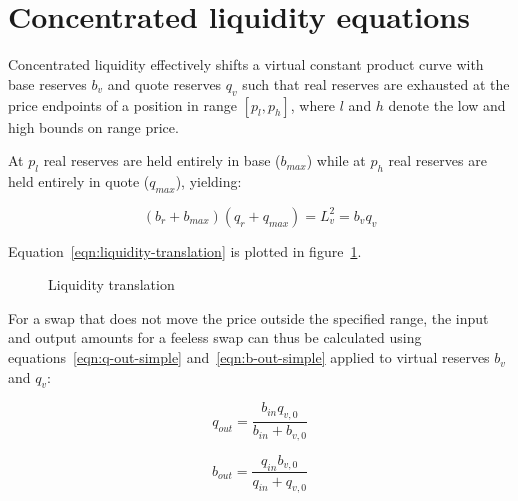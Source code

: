 \documentclass[twocolumn]{article}
\begin{document}
\section{Concentrated liquidity equations}


Concentrated liquidity effectively shifts a virtual constant product curve with base reserves $b_v$
and quote reserves $q_v$ such that real reserves are exhausted at the price endpoints of a position
in range $[p_l, p_h]$, where $l$ and $h$ denote the low and high bounds on range price.

At $p_l$ real reserves are held entirely in base ($b_{max}$) while at $p_h$ real reserves are held
entirely in quote ($q_{max}$), yielding:

\begin{equation} \label{eqn:liquidity-translation}
  (b_r + b_{max})(q_r + q_{max}) = L_v^2 = b_v q_v
\end{equation}

Equation~\ref{eqn:liquidity-translation} is plotted in figure~\ref{fig:liquidity-translation}.

\begin{figure}[ht]
  \centering
  
  \caption{Liquidity translation}
  \label{fig:liquidity-translation}
\end{figure}

For a swap that does not move the price outside the specified range, the input and output amounts
for a feeless swap can thus be calculated using equations~\ref{eqn:q-out-simple}
and~\ref{eqn:b-out-simple} applied to virtual reserves $b_v$ and $q_v$:

\begin{equation}
  q_{out} = \frac{b_{in} q_{v, 0}}{b_{in} + b_{v, 0}}
\end{equation}

\begin{equation}
  b_{out} = \frac{q_{in} b_{v, 0}}{q_{in} + q_{v, 0}}
\end{equation}
\end{document}
